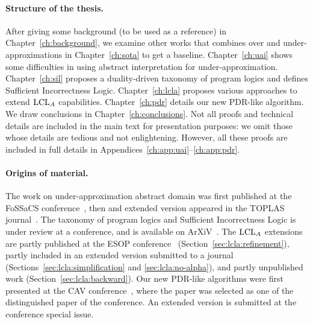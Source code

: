 \paragraph*{Structure of the thesis.}
After giving some background (to be used as a reference) in Chapter~\ref{ch:background}, we examine other works that combines over and under-approximations in Chapter~\ref{ch:sota} to get a baseline.
Chapter~\ref{ch:uai} shows some difficulties in using abstract interpretation for under\hyp{}approximation.
Chapter~\ref{ch:sil} proposes a duality-driven taxonomy of program logics and defines Sufficient Incorrectness Logic.
Chapter~\ref{ch:lcla} proposes various approaches to extend $\text{LCL}_A$ capabilities.
Chapter~\ref{ch:pdr} details our new PDR-like algorithm.
We draw conclusions in Chapter~\ref{ch:conclusions}. Not all proofs and technical details are included in the main text for presentation purposes: we omit those whose details are tedious and not enlightening. However, all these proofs are included in full details in Appendices~\ref{ch:app:uai}--\ref{ch:app:pdr}.

\paragraph*{Origins of material.}
The work on under-approximation abstract domain was first published at the FoSSaCS conference~\cite{ABG22}, then and extended version appeared in the TOPLAS journal~\cite{ABG24}. The taxonomy of program logics and Sufficient Incorrectness Logic is under review at a conference, and is available on ArXiV~\cite{ABGL24}.
The $\text{LCL}_A$ extensions are partly published at the ESOP conference~\cite{ABG23} (Section~\ref{sec:lcla:refinement}), partly included in an extended version submitted to a journal (Sections~\ref{sec:lcla:simplification} and \ref{sec:lcla:no-alpha}), and partly unpublished work (Section~\ref{sec:lcla:backward}).
Our new PDR-like algorithms were first presented at the CAV conference~\cite{KABBGH23}, where the paper was selected as one of the distinguished paper of the conference. An extended version is submitted at the conference special issue.
